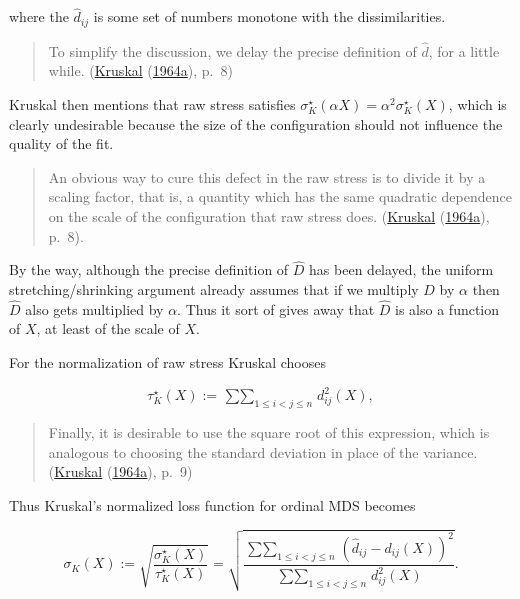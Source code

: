 \documentclass[
  12pt,
]{book}
\theoremstyle{definition}
\theoremstyle{definition}
\theoremstyle{definition}
\theoremstyle{definition}
\theoremstyle{remark}
\begin{document}
where the \(\hat d_{ij}\) is some set of numbers monotone with the dissimilarities.

\begin{quote}
To simplify the discussion, we delay the precise definition of
\(\hat d\), for a little while. (\protect\hyperlink{ref-kruskal_64a}{Kruskal} (\protect\hyperlink{ref-kruskal_64a}{1964a}), p.~8)
\end{quote}

Kruskal then mentions that raw stress satisfies \(\sigma^\star_K(\alpha X)=\alpha^2\sigma^\star_K(X)\), which is clearly undesirable because
the size of the configuration should not influence the quality of
the fit.

\begin{quote}
An obvious way to cure this defect in the raw stress is to divide it by a
scaling factor, that is, a quantity which has the same quadratic
dependence on the scale of the configuration that raw stress does.
(\protect\hyperlink{ref-kruskal_64a}{Kruskal} (\protect\hyperlink{ref-kruskal_64a}{1964a}), p.~8).
\end{quote}

By the way, although the precise definition of \(\hat D\)
has been delayed, the uniform stretching/shrinking argument already assumes that
if we multiply \(D\) by \(\alpha\) then \(\hat D\) also gets multiplied
by \(\alpha\). Thus it sort of gives away that \(\hat D\) is also a
function of \(X\), at least of the scale of \(X\).

For the normalization of raw stress Kruskal chooses

\begin{equation}
\tau^\star_K(X):=\mathop{\sum\sum}_{1\leq i<j\leq n} d_{ij}^2(X),
\label{eq:rawtau}
\end{equation}

\begin{quote}
Finally, it is desirable to use the square root of this expression, which
is analogous to choosing the standard deviation in place of the variance.
(\protect\hyperlink{ref-kruskal_64a}{Kruskal} (\protect\hyperlink{ref-kruskal_64a}{1964a}), p.~9)
\end{quote}

Thus Kruskal's normalized loss function for ordinal MDS becomes

\begin{equation}
\sigma_K(X):=\sqrt{\frac{\sigma^\star_K(X)}{\tau^\star_K(X)}}=\sqrt{\frac{\mathop{\sum\sum}_{1\leq i<j\leq n} (\hat d_{ij}-d_{ij}(X))^2}{\mathop{\sum\sum}_{1\leq i<j\leq n} d_{ij}^2(X)}}.
\label{eq:kruskalstress}
\end{equation}
\end{document}
